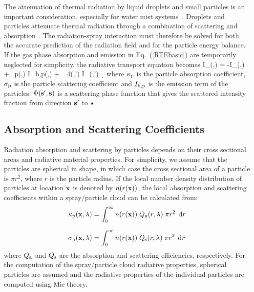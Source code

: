The attenuation of thermal radiation by liquid droplets and small particles is an important consideration, especially for water mist systems~\cite{Ravigururajan:1}.  Droplets and particles attenuate thermal radiation through a combination of scattering and absorption~\cite{Tuntomo:1}.  The radiation-spray interaction must therefore be solved for both the accurate prediction of the radiation field and for the particle energy balance. If the gas phase absorption and emission in Eq.~(\ref{RTEbasic}) are temporarily neglected for simplicity, the radiative transport equation becomes
\be
\bs \cdot \nabla I_{\la}(\bx,\bs) = -
I_{\la}(\bx,\bs) +\kappa_{\rm p}(\bx,\la) \; I_{{\rm b,p}}(\bx,\la) +
\int_{4\pi}\Phi(\bs,\bs') \; I_{\la}(\bx,\bs') \, \d\Omega
\label{RTEspray}
\ee
where $\kappa_{\rm p}$ is the particle absorption coefficient, $\sigma_{\rm p}$ is the particle scattering coefficient and $I_{{\rm b,p}}$ is the emission term of the particles. $\Phi({\mathbf{s}}',{\mathbf{s}})$ is a scattering phase function that gives the scattered intensity fraction from direction ${\mathbf{s}}'$ to ${\mathbf{s}}$.

\subsection{Absorption and Scattering Coefficients}

Radiation absorption and scattering by particles depends on their cross sectional areas and radiative material properties. For simplicity, we assume that the particles are spherical in shape, in which case the cross sectional area of a particle is $\pi r^2$, where $r$ is the particle radius. If the local number density distribution of particles at location ${\mathbf{x}}$ is denoted by $n(r({\mathbf{x}}))$, the local absorption and scattering coefficients within a spray/particle cloud can be calculated from:
\begin{align}
\kappa_{\rm p}(\bx,\la) &= \int_0^\infty n(r(\bx)) \; Q_{\rm a}(r,\la) \; \pi r^2 \; \d r \\[0.1in] %
\sigma_{\rm p}(\bx,\la) &= \int_0^\infty n(r(\bx)) \; Q_{\rm s}(r,\la) \; \pi r^2 \; \d r           %
\end{align}
where $Q_{\rm a}$ and $Q_{\rm s}$ are the absorption and scattering efficiencies, respectively. For the computation of the spray/particle cloud radiative properties, spherical particles are assumed and the radiative properties of the individual particles are computed using Mie theory.

